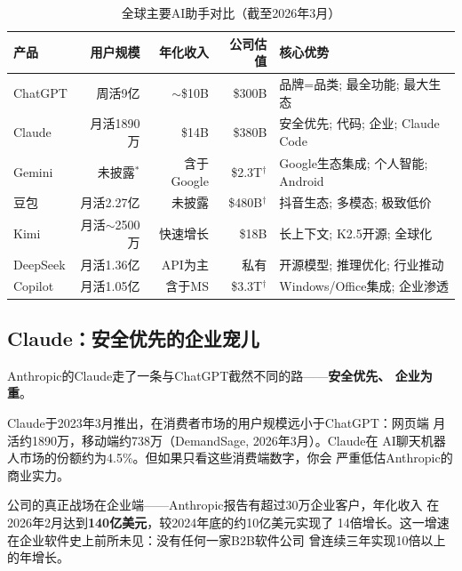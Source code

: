 \begin{table}[htbp]
\centering
\caption{全球主要AI助手对比（截至2026年3月）}
\label{tab:ai-assistants-comparison}
\small
\begin{tabularx}{\textwidth}{l r r r X}
\toprule
\rowcolor{figLightGray}
\textbf{产品} & \textbf{用户规模} & \textbf{年化收入}
  & \textbf{公司估值} & \textbf{核心优势} \\
\midrule
ChatGPT     & 周活9亿
  & $\sim$\$10B & \$300B & 品牌=品类; 最全功能; 最大生态 \\
Claude      & 月活1890万
  & \$14B & \$380B & 安全优先; 代码; 企业; Claude Code \\
Gemini      & 未披露$^*$
  & 含于Google & \$2.3T$^\dagger$ & Google生态集成; 个人智能; Android \\
豆包        & 月活2.27亿
  & 未披露 & \$480B$^\dagger$ & 抖音生态; 多模态; 极致低价 \\
Kimi        & 月活$\sim$2500万
  & 快速增长 & \$18B & 长上下文; K2.5开源; 全球化 \\
DeepSeek    & 月活1.36亿
  & API为主 & 私有 & 开源模型; 推理优化; 行业推动 \\
Copilot     & 月活1.05亿
  & 含于MS & \$3.3T$^\dagger$ & Windows/Office集成; 企业渗透 \\
\bottomrule
\end{tabularx}

\medskip
{}
\end{table}

\subsection{Claude：安全优先的企业宠儿}
\label{subsec:claude-assistant}

Anthropic的Claude走了一条与ChatGPT截然不同的路——\textbf{安全优先、
企业为重}。

Claude于2023年3月推出，在消费者市场的用户规模远小于ChatGPT：网页端
月活约1890万，移动端约738万（DemandSage, 2026年3月）。Claude在
AI聊天机器人市场的份额约为4.5\%。但如果只看这些消费端数字，你会
严重低估Anthropic的商业实力。

公司的真正战场在企业端——Anthropic报告有超过30万企业客户，年化收入
在2026年2月达到\textbf{140亿美元}，较2024年底的约10亿美元实现了
14倍增长。这一增速在企业软件史上前所未见：没有任何一家B2B软件公司
曾连续三年实现10倍以上的年增长。

